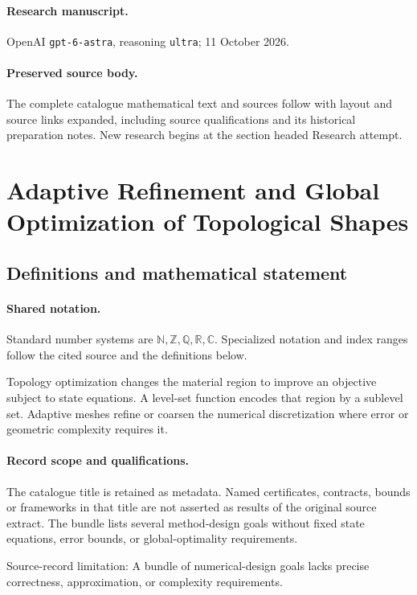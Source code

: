 \documentclass[11pt]{article}
\begin{document}
\paragraph{Research manuscript.} OpenAI \texttt{gpt-6-astra}, reasoning \texttt{ultra}; 11 October 2026.
\paragraph{Preserved source body.} The complete catalogue mathematical text and sources follow with layout and source links expanded, including source qualifications and its historical preparation notes. New research begins at the section headed Research attempt.

\section{Adaptive Refinement and Global Optimization of Topological Shapes}\label{statement}

\subsection{Definitions and mathematical statement}

\paragraph{Shared notation.}Standard number systems are $\mathbb N,\mathbb Z,\mathbb Q,\mathbb R,\mathbb C$. Specialized notation and index ranges follow the cited source and the definitions below.


Topology optimization changes the material region to improve an objective subject to state equations. A level-set function encodes that region by a sublevel set. Adaptive meshes refine or coarsen the numerical discretization where error or geometric complexity requires it.
\paragraph{Record scope and qualifications.}
The catalogue title is retained as metadata. Named certificates, contracts, bounds or frameworks in that title are not asserted as results of the original source extract.
The bundle lists several method-design goals without fixed state equations, error bounds, or global-optimality requirements.

Source-record limitation: A bundle of numerical-design goals lacks precise correctness, approximation, or complexity requirements.
\end{document}

